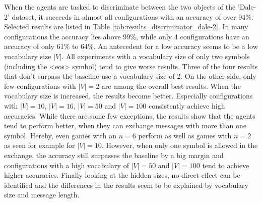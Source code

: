 When the agents are tasked to discriminate between the two objects of the 'Dale-2' dataset, it succeeds in almost all configurations with an accuracy of over 94\%.
Selected results are listed in Table \ref{tab:results_discriminator_dale-2}.
In many configurations the accuracy lies above 99\%, while only 4 configurations have an accuracy of only 61\% to 64\%.
An antecedent for a low accuracy seems to be a low vocabulary size $|V|$.
All experiments with a vocabulary size of only two symbols (including the <eos> symbol) tend to give worse results.
Three of the four results that don't surpass the baseline use a vocabulary size of 2.
On the other side, only few configurations with $|V| = 2$ are among the overall best results.
When the vocabulary size is increased, the results become better.
Especially configurations with $|V| = 10$, $|V| = 16$, $|V| = 50$ and $|V| = 100$ consistently achieve high accuracies.
While there are some few exceptions, the results show that the agents tend to perform better, when they can exchange messages with more than one symbol.
Hereby, even games with an $n = 6$ perform as well as games with $n = 2$ as seen for example for $|V| = 10$.
However, when only one symbol is allowed in the exchange, the accuracy still surpasses the baseline by a big margin and configurations with a high vocabulary of $|V| = 50$ and $|V| = 100$ tend to achieve higher accuracies.
Finally looking at the hidden sizes, no direct effect can be identified and the differences in the results seem to be explained by vocabulary size and message length.

